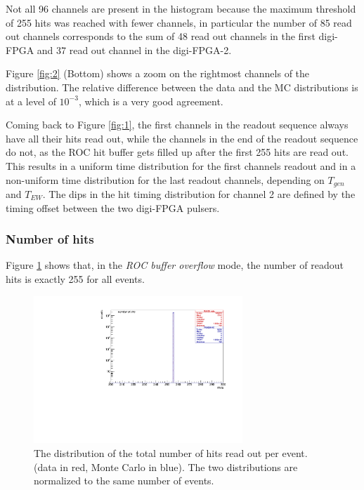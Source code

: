 Not all 96 channels are present in the 
histogram because the maximum 
threshold of 255 hits was reached with 
fewer channels, in particular the number of 
85 read out channels corresponds to the 
sum of 48 read out channels in the first 
digi-FPGA and 37 read out channel in the digi-FPGA-2.


Figure \ref{fig:2} (Bottom) shows a zoom on the 
rightmost channels of the distribution.
The relative difference between the data and 
the MC distributions 
is at a level of $10^{-3}$, which is a 
very good agreement.


Coming back to Figure \ref{fig:1}, the first 
channels in the readout sequence
always have all their hits read out,
while the channels in the end of the readout sequence do not,
as the ROC hit buffer gets filled up after
the first 255 hits are read out.
This results in a uniform time distribution 
for the first channels readout and in a non-uniform
time distribution for the last readout channels, 
depending on $T_{gen}$ and $T_{EW}$.
The dips in the hit timing distribution for 
channel 2 are defined by the timing offset
between the two digi-FPGA pulsers. 


\subsubsection{Number of hits}
Figure \ref{fig:3} shows that, in the \textit{ROC buffer overflow} 
mode, the number of readout hits is exactly 255 for all events.

\begin{figure}[!h]
\centering
\includegraphics[width =0.7\textwidth]{figures/pdf/figure_00008_nhits_281.pdf}
\caption[The distribution of the total number of hits read out per event.]{
  The distribution of the total number of hits read out per event. 
  (data in red, Monte Carlo in blue). The two distributions 
  are normalized to the same number of events.
}
\label{fig:3}
\end{figure}
